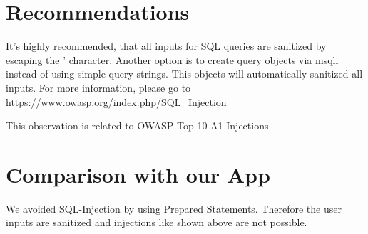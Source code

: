 \section{Recommendations}
It's highly recommended, that all inputs for SQL queries are sanitized by escaping the ' character.
Another option is to create query objects via msqli instead of using simple query strings.
This objects will automatically sanitized all inputs. For more information, please go to \url{https://www.owasp.org/index.php/SQL\_Injection}

This observation is related to OWASP Top 10-A1-Injections

\section{Comparison with our App}
We avoided SQL-Injection by using Prepared Statements. Therefore the user inputs are sanitized and injections like shown above are not possible.
